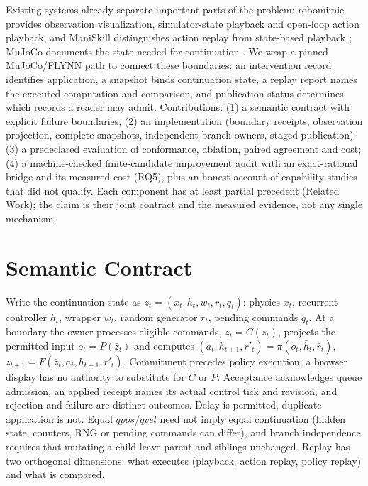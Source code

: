 \documentclass[letterpaper]{article}
\begin{document}
Existing systems already separate important parts of the problem: robomimic provides observation
visualization, simulator-state playback and open-loop action playback, and ManiSkill distinguishes action
replay from state-based playback \citep{robomimicplayback,maniskillreplay}; MuJoCo documents the state
needed for continuation \citep{mujococomputation}. We wrap a pinned MuJoCo/FLYNN path
\citep{wang2026flynn} to connect these boundaries: an intervention record identifies application, a
snapshot binds continuation state, a replay report names the executed computation and comparison, and
publication status determines which records a reader may admit. Contributions: (1) a semantic contract with
explicit failure boundaries; (2) an implementation (boundary receipts, observation projection, complete
snapshots, independent branch owners, staged publication); (3) a predeclared evaluation of conformance,
ablation, paired agreement and cost; (4) a machine-checked finite-candidate improvement audit with an exact-rational
bridge and its measured cost (RQ5), plus an honest account of capability studies that did not qualify. Each component has at least
partial precedent (Related Work); the claim is their joint contract and the measured evidence, not any single mechanism.

\section{Semantic Contract}
Write the continuation state as $z_t=(x_t,h_t,w_t,r_t,q_t)$: physics $x_t$, recurrent controller $h_t$,
wrapper $w_t$, random generator $r_t$, pending commands $q_t$. At a boundary the owner processes eligible
commands, $\bar z_t=C(z_t)$, projects the permitted input $o_t=P(\bar z_t)$ and computes
$(a_t,h_{t+1},r'_t)=\pi(o_t,\bar h_t,\bar r_t)$, $z_{t+1}=F(\bar z_t,a_t,h_{t+1},r'_t)$.
Commitment precedes policy execution; a browser display has no authority to substitute for $C$ or $P$.
Acceptance acknowledges queue admission, an applied receipt names its actual control tick and revision,
and rejection and failure are distinct outcomes. Delay is permitted, duplicate application is not.
Equal $qpos$/$qvel$ need not imply equal continuation (hidden state, counters, RNG or pending commands can
differ), and branch independence requires that mutating a child leave parent and siblings unchanged.
Replay has two orthogonal dimensions: what executes (playback, action replay, policy replay) and what is compared.
\end{document}
